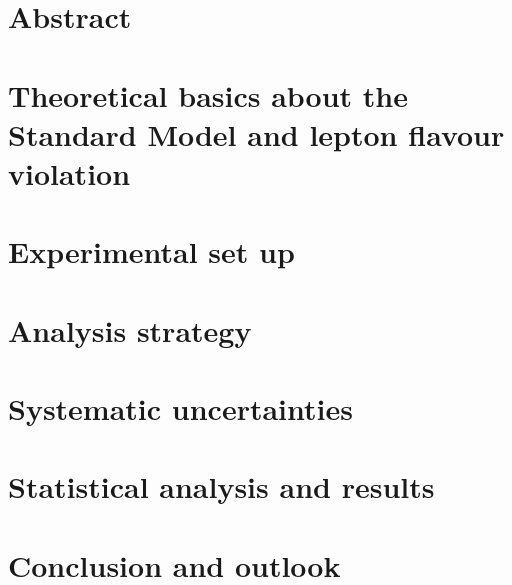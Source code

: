 \documentclass[12pt,twoside]{book}
\begin{document}

\clearpage{\pagestyle{empty}\cleardoublepage}

\chapter*{Abstract}

\clearpage{\pagestyle{empty}\cleardoublepage}

\tableofcontents
\thispagestyle{empty}
\clearpage{\pagestyle{empty}\cleardoublepage}

\listoffigures
\thispagestyle{empty}
\clearpage{\pagestyle{empty}\cleardoublepage}

\listoftables
\thispagestyle{empty}
\clearpage{\pagestyle{empty}\cleardoublepage}

\chapter{Theoretical basics about the Standard Model and lepton flavour violation}

\clearpage{\pagestyle{empty}\cleardoublepage}

\chapter{Experimental set up}

\clearpage{\pagestyle{empty}\cleardoublepage}

\chapter{Analysis strategy}

\clearpage{\pagestyle{empty}\cleardoublepage}

\chapter{Systematic uncertainties}

\clearpage{\pagestyle{empty}\cleardoublepage}

\chapter{Statistical analysis and results}

\clearpage{\pagestyle{empty}\cleardoublepage}

\chapter{Conclusion and outlook}

\clearpage{\pagestyle{empty}\cleardoublepage}
\end{document}
